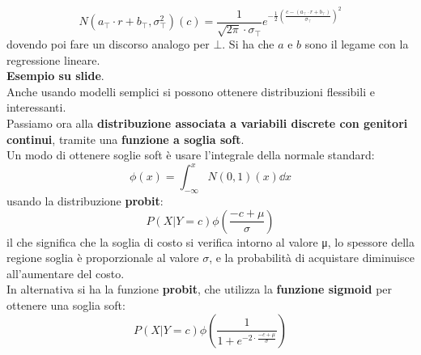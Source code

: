 \message{ !name(modprob.tex)}\documentclass[a4paper,12pt, oneside]{book}
\begin{document}
\[N(a_\top\cdot r+b_\top, \sigma_\top^2)(c)=\frac{1}{\sqrt{2\pi}\cdot
    \sigma_\top}e^{-\frac{1}{2}\left(\frac{c-(a_\top\cdot
        r+b_\top)}{\sigma_\top}\right)^2}\]
dovendo poi fare un discorso analogo per $\bot$. Si ha che $a$ e $b$ sono il
legame con la regressione lineare.\\
\textbf{Esempio su slide}.\\
Anche usando modelli semplici si possono ottenere distribuzioni flessibili e
interessanti. \\
Passiamo ora alla \textbf{distribuzione associata a variabili discrete con
  genitori continui}, tramite una \textbf{funzione a soglia soft}. \\
Un modo di ottenere soglie soft è usare l'integrale della normale standard:
\[\phi(x)=\int_{-\infty}^x N(0,1)(x)\dd{x}\]
usando la distribuzione \textbf{probit}:
\[P(X|Y=c)\phi(\frac{-c+\mu}{\sigma})\]
il che significa che la soglia di costo si verifica intorno al valore μ, lo
spessore della regione soglia è 
proporzionale al valore $\sigma$, e la probabilità di acquistare diminuisce
all’aumentare del costo. \\
In alternativa si ha la funzione \textbf{probit}, che utilizza la
\textbf{funzione sigmoid} per ottenere una soglia soft:
\[P(X|Y=c)\phi(\frac{1}{1+e^{-2\cdot\frac{-c+\mu}{\sigma}}})\]
\end{document}
